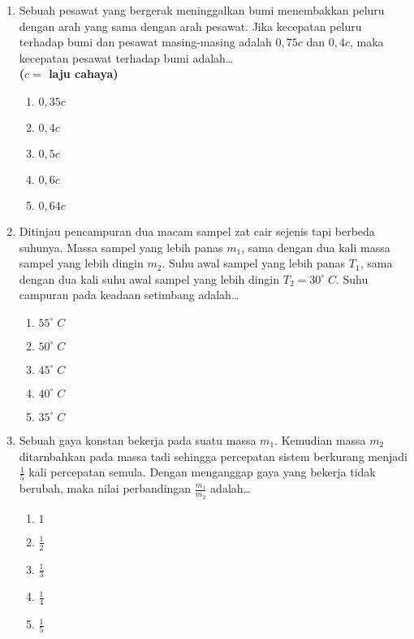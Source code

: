 \documentclass[A4,12PT, english, twocolumn]{journal}
\begin{document}
\begin{enumerate}
\item Sebuah pesawat yang bergerak meninggalkan bumi menembakkan peluru dengan arah yang sama dengan arah pesawat. Jika kecepatan peluru terhadap bumi dan pesawat
masing-masing adalah $0,75c$ dan $0,4c$, maka kecepatan pesawat terhadap bumi adalah\dots \\
\textbf{($c=$ laju cahaya)}
	\begin{enumerate}
		\item $0,35c$
		\item $0,4c$
		\item $0,5c$
		\item $0,6c$
		\item $0,64c$
	\end{enumerate}
	
\item Ditinjau pencampuran dua macam sampel zat cair sejenis tapi berbeda suhunya. Massa sampel yang lebih panas $m_1$, sama dengan dua kali massa sampel yang lebih dingin $m_2$. Suhu awal sampel yang lebih panas $T_1$, sama dengan dua kali suhu awal sampel yang lebih dingin
$T_2 = 30^\circ \; C$. Suhu campuran pada keadaan setimbang adalah\dots
   \begin{enumerate}
        \item $55^\circ \; C$
        \item $50^\circ \; C$
        \item $45^\circ \; C$
        \item $40^\circ \; C$
        \item $35^\circ \; C$
   \end{enumerate}
   
   
\item Sebuah gaya konstan bekerja pada suatu massa $m_1$. Kemudian massa $m_2$ ditarnbahkan pada massa tadi sehingga percepatan sistem berkurang menjadi $\frac{1}{5}$ kali percepatan semula. Dengan menganggap gaya yang bekerja tidak berubah, maka nilai perbandingan $\frac{m_1}{m_2}$ adalah\dots
    \begin{enumerate}
        \item $1$
        \item $\frac{1}{2}$
        \item $\frac{1}{3}$
        \item $\frac{1}{4}$
        \item $\frac{1}{5}$
    \end{enumerate}
  

\end{enumerate}
\end{document}
